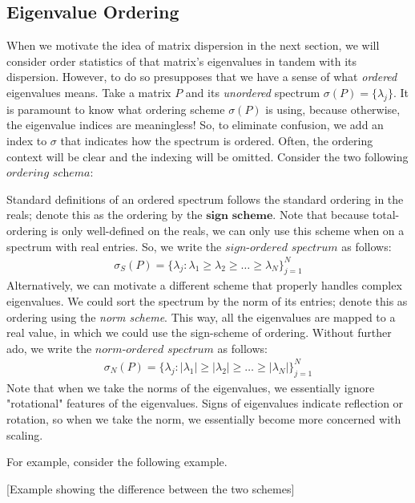 
\subsection{Eigenvalue Ordering}
When we motivate the idea of matrix dispersion in the next section, we will consider order statistics of that matrix's eigenvalues in tandem with its dispersion. However, to do so presupposes that we have a sense of what \textit{ordered} eigenvalues means. Take a matrix $P$ and its \textit{unordered} spectrum $\sigma(P) = \{\lambda_j\}$. It is paramount to know what ordering scheme $\sigma(P)$ is using, because otherwise, the eigenvalue indices are meaningless! So, to eliminate confusion, we add an index to $\sigma$ that indicates how the spectrum is ordered. Often, the ordering context will be clear and the indexing will be omitted. Consider the two following $\textit{ordering schema}$:

Standard definitions of an ordered spectrum follows the standard ordering in the reals; denote this as the ordering by the $\textbf{sign scheme}$. Note that because total-ordering is only well-defined on the reals, we can only use this scheme when on a spectrum with real entries. So, we write the $\textit{sign-ordered spectrum}$ as follows:
\begin{align*}
\sigma_S(P) = \{\lambda_j : \lambda_1 \geq \lambda_2 \geq \dots \geq \lambda_N\}_{j = 1}^N
\end{align*}
Alternatively, we can motivate a different scheme that properly handles complex eigenvalues. We could sort the spectrum by the norm of its entries; denote this as ordering using the \textit{norm scheme}. This way, all the eigenvalues are mapped to a real value, in which we could use the sign-scheme of ordering. Without further ado, we write the $\textit{norm-ordered spectrum}$ as follows:
\begin{align*}
\sigma_N(P) = \{\lambda_j : |\lambda_1| \geq |\lambda_2| \geq \dots \geq |\lambda_N|\}_{j = 1}^N
\end{align*}
Note that when we take the norms of the eigenvalues, we essentially ignore "rotational" features of the eigenvalues. Signs of eigenvalues indicate reflection or rotation, so when we take the norm, we essentially become more concerned with scaling. 

For example, consider the following example.
\begin{center}
[Example showing the difference between the two schemes]
\end{center}

